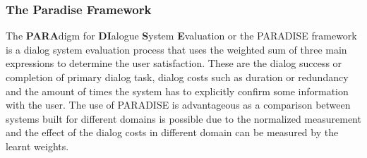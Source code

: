 \documentclass[12pt]{extarticle}
\numberwithin{equation}{section}
\begin{document}
	\subsubsection{The Paradise Framework}
	The \textbf{PARA}digm for \textbf{DI}alogue \textbf{S}ystem \textbf{E}valuation or the PARADISE framework \cite{walker1997paradise} is a dialog system evaluation process that uses the weighted sum of three main expressions to determine the user satisfaction. These are the dialog success or completion of primary dialog task, dialog costs such as duration or redundancy and the amount of times the system has to explicitly confirm some information with the user. The use of PARADISE is advantageous as a comparison between systems built for different domains is possible due to the normalized measurement and the effect of the dialog costs in different domain can be measured by the learnt weights.
\end{document}
